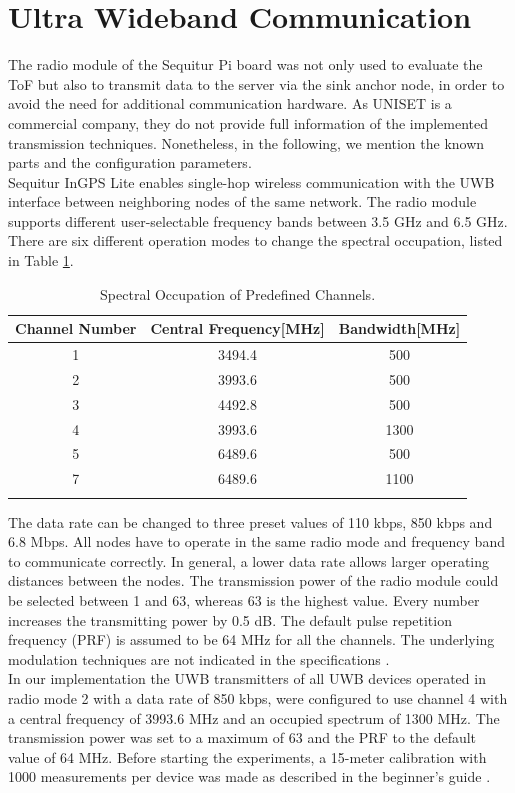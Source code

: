 \section{Ultra Wideband Communication}
The radio module of the Sequitur Pi board was not only used  to evaluate the ToF but also to transmit data to the server via the sink anchor node, in order to avoid the need for additional communication hardware. As UNISET is a commercial company, they do not provide full information of the implemented transmission techniques. Nonetheless, in the following, we mention the known parts and the configuration parameters.\\
\noindent\hspace*{5mm}%
Sequitur InGPS Lite enables single-hop wireless communication with the UWB interface between neighboring nodes of the same network. The radio module supports different user-selectable frequency bands between 3.5 GHz and 6.5 GHz. There are six different operation modes to change the spectral occupation, listed in Table \ref{tab:spectral_occupation}.\\
\begin{table}
\caption{Spectral Occupation of Predefined Channels.}
\label{tab:spectral_occupation}
\centering
\begin{tabular}{c c c}
\toprule
\textbf{Channel Number} & \textbf{Central Frequency}[MHz] & \textbf{Bandwidth}[MHz]\\
\midrule
1 & 3494.4 & 500\\
2 & 3993.6 & 500\\
3 & 4492.8 & 500\\
4 & 3993.6 & 1300\\
5 & 6489.6 & 500\\
7 & 6489.6 & 1100\\
\bottomrule\\
\end{tabular}
\end{table}
The data rate can be changed to three preset values of 110 kbps, 850 kbps and 6.8 Mbps. All nodes have to operate in the same radio mode and frequency band to communicate correctly. In general, a lower data rate allows larger operating distances between the nodes. The transmission power of the radio module could be selected between 1 and 63, whereas 63 is the highest value. Every number increases the transmitting power by 0.5 dB. The default pulse repetition frequency (PRF) is assumed to be 64 MHz for all the channels. The underlying modulation techniques are not indicated in the specifications \cite{Usermanual, Beginnersguide}.\\
\noindent\hspace*{5mm}%
In our implementation the UWB transmitters of all UWB devices operated in radio mode 2 with a data rate of 850 kbps, were configured to use channel 4 with a central frequency of 3993.6 MHz and an occupied spectrum of 1300 MHz. The transmission power was set to a maximum of 63 and the PRF to the default value of 64 MHz. Before starting the experiments, a 15-meter calibration with 1000 measurements per device was made as described in the beginner's guide \cite{Beginnersguide}.